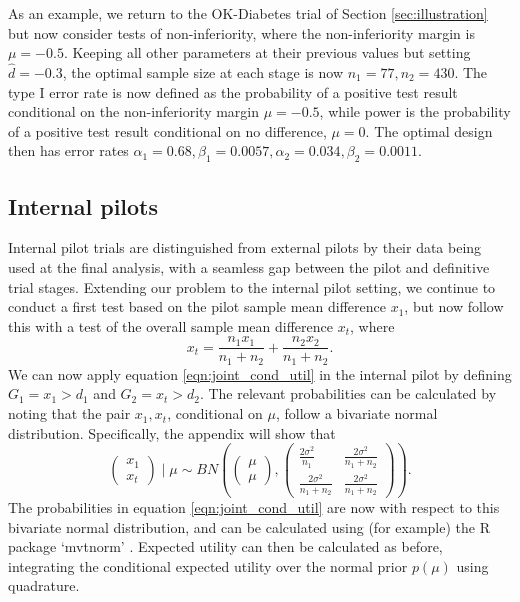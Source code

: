 \documentclass[sagev, Crown]{sagej} %
\begin{document}
As an example, we return to the OK-Diabetes trial of Section \ref{sec:illustration} but now consider tests of non-inferiority, where the non-inferiority margin is $\mu = -0.5$. Keeping all other parameters at their previous values but setting $\hat{d} = -0.3$, the optimal sample size at each stage is now $n_1 = 77, n_2 = 430$. The type I error rate is now defined as the probability of a positive test result conditional on the non-inferiority margin $\mu = -0.5$, while power is the probability of a positive test result conditional on no difference, $\mu = 0$. The optimal design then has error rates $\alpha_1 = 0.68, \beta_1 = 0.0057, \alpha_2 = 0.034, \beta_2 = 0.0011$.

\subsection{Internal pilots}

Internal pilot trials are distinguished from external pilots by their data being used at the final analysis, with a seamless gap between the pilot and definitive trial stages. Extending our problem to the internal pilot setting, we continue to conduct a first test based on the pilot sample mean difference $x_1$, but now follow this with a test of the overall sample mean difference $x_t$, where
$$
x_t = \frac{n_1 x_1}{n_1 + n_2} + \frac{n_2 x_2}{n_1 + n_2}.
$$
We can now apply equation \ref{eqn:joint_cond_util} in the internal pilot by defining $G_1 = x_1 > d_1$ and $G_2 = x_t > d_2$. The relevant probabilities can be calculated by noting that the pair $x_1, x_t$, conditional on $\mu$, follow a bivariate normal distribution. Specifically, the appendix will show that
$$
\begin{pmatrix}
x_1 \\
x_t
\end{pmatrix} \mid \mu
\sim BN\left( 
\begin{pmatrix}
\mu \\
\mu
\end{pmatrix},
\begin{pmatrix}
\frac{2\sigma^2}{n_1} & \frac{2\sigma^2}{n_1 + n_2} \\
\frac{2\sigma^2}{n_1 + n_2} & \frac{2\sigma^2}{n_1 + n_2}
\end{pmatrix} \right).
$$
The probabilities in equation \ref{eqn:joint_cond_util} are now with respect to this bivariate normal distribution, and can be calculated using (for example) the R package `mvtnorm' \cite{Genz2017}. Expected utility can then be calculated as before, integrating the conditional expected utility over the normal prior $p(\mu)$ using quadrature.
\end{document}
